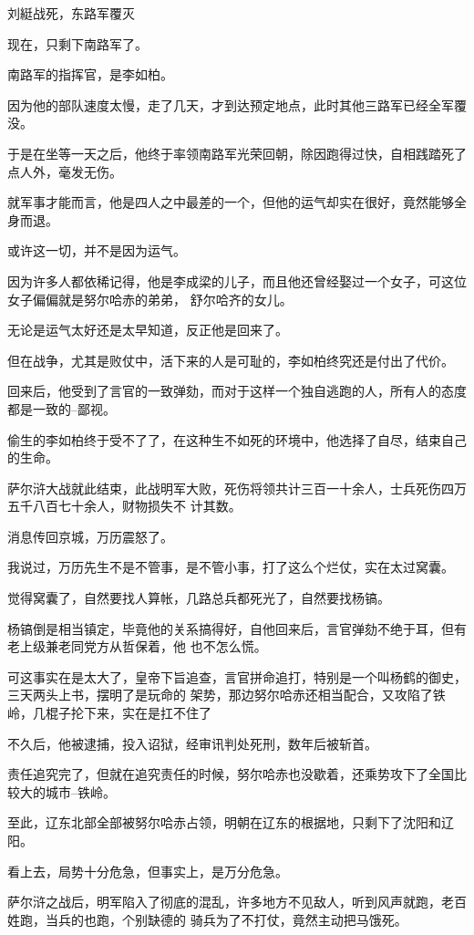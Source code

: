 \documentclass[11pt,a4paper,onecolumn]{article}
\begin{document}
刘綎战死，东路军覆灭

现在，只剩下南路军了。

南路军的指挥官，是李如柏。

因为他的部队速度太慢，走了几天，才到达预定地点，此时其他三路军已经全军覆没。

于是在坐等一天之后，他终于率领南路军光荣回朝，除因跑得过快，自相践踏死了点人外，毫发无伤。

就军事才能而言，他是四人之中最差的一个，但他的运气却实在很好，竟然能够全身而退。

或许这一切，并不是因为运气。

因为许多人都依稀记得，他是李成梁的儿子，而且他还曾经娶过一个女子，可这位女子偏偏就是努尔哈赤的弟弟，
舒尔哈齐的女儿。

无论是运气太好还是太早知道，反正他是回来了。

但在战争，尤其是败仗中，活下来的人是可耻的，李如柏终究还是付出了代价。

回来后，他受到了言官的一致弹劾，而对于这样一个独自逃跑的人，所有人的态度都是一致的--鄙视。

偷生的李如柏终于受不了了，在这种生不如死的环境中，他选择了自尽，结束自己的生命。

萨尔浒大战就此结束，此战明军大败，死伤将领共计三百一十余人，士兵死伤四万五千八百七十余人，财物损失不
计其数。

消息传回京城，万历震怒了。

我说过，万历先生不是不管事，是不管小事，打了这么个烂仗，实在太过窝囊。

觉得窝囊了，自然要找人算帐，几路总兵都死光了，自然要找杨镐。

杨镐倒是相当镇定，毕竟他的关系搞得好，自他回来后，言官弹劾不绝于耳，但有老上级兼老同党方从哲保着，他
也不怎么慌。

可这事实在是太大了，皇帝下旨追查，言官拼命追打，特别是一个叫杨鹤的御史，三天两头上书，摆明了是玩命的
架势，那边努尔哈赤还相当配合，又攻陷了铁岭，几棍子抡下来，实在是扛不住了

不久后，他被逮捕，投入诏狱，经审讯判处死刑，数年后被斩首。

责任追究完了，但就在追究责任的时候，努尔哈赤也没歇着，还乘势攻下了全国比较大的城市--铁岭。

至此，辽东北部全部被努尔哈赤占领，明朝在辽东的根据地，只剩下了沈阳和辽阳。

看上去，局势十分危急，但事实上，是万分危急。

萨尔浒之战后，明军陷入了彻底的混乱，许多地方不见敌人，听到风声就跑，老百姓跑，当兵的也跑，个别缺德的
骑兵为了不打仗，竟然主动把马饿死。
\end{document}
